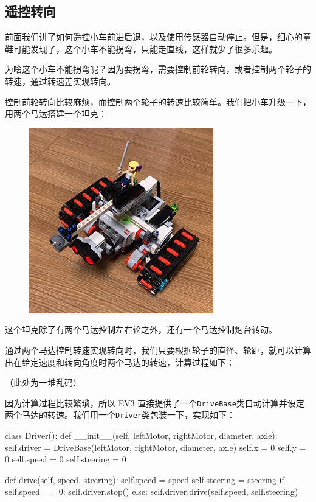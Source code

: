 \hypertarget{ux9065ux63a7ux8f6cux5411}{%
\subsection{遥控转向}\label{ux9065ux63a7ux8f6cux5411}}

前面我们讲了如何遥控小车前进后退，以及使用传感器自动停止。但是，细心的童鞋可能发现了，这个小车不能拐弯，只能走直线，这样就少了很多乐趣。

为啥这个小车不能拐弯呢？因为要拐弯，需要控制前轮转向，或者控制两个轮子的转速，通过转速差实现转向。

控制前轮转向比较麻烦，而控制两个轮子的转速比较简单。我们把小车升级一下，用两个马达搭建一个坦克：

 
 \begin{figure}[htp]
	\centering
	\includegraphics[width=0.6\linewidth]{fig/1346727531511874l.png}
\end{figure}


这个坦克除了有两个马达控制左右轮之外，还有一个马达控制炮台转动。

通过两个马达控制转速实现转向时，我们只要根据轮子的直径、轮距，就可以计算出在给定速度和转向角度时两个马达的转速，计算过程如下：

（此处为一堆乱码）

因为计算过程比较繁琐，所以 EV3
直接提供了一个\texttt{DriveBase}类自动计算并设定两个马达的转速。我们用一个\texttt{Driver}类包装一下，实现如下：

\begin{pythoncode}
class Driver():
    def __init__(self, leftMotor, rightMotor, diameter, axle):
        self.driver = DriveBase(leftMotor, rightMotor, diameter, axle)
        self.x = 0
        self.y = 0
        self.speed = 0
        self.steering = 0

    def drive(self, speed, steering):
        self.speed = speed
        self.steering = steering
        if self.speed == 0:
            self.driver.stop()
        else:
            self.driver.drive(self.speed, self.steering)
\end{pythoncode}


